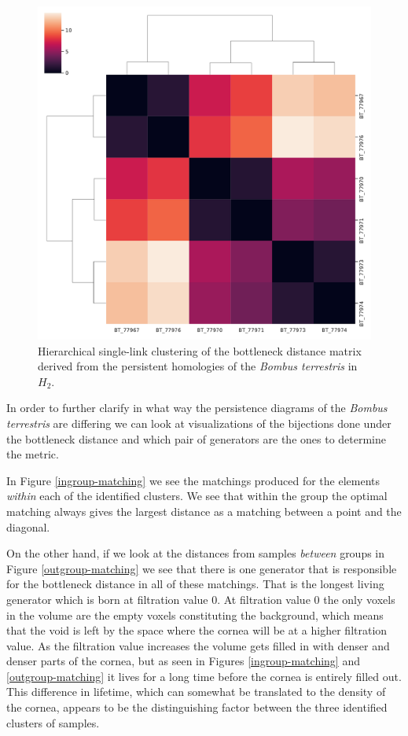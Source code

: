 \begin{figure}[ht]
  \centering
  \includegraphics[scale=0.35]{clusters/bottleneck_h2_cluster.pdf}
  \caption{\label{h2b} Hierarchical single-link clustering of the bottleneck distance matrix derived from the persistent homologies of the \textit{Bombus terrestris} in $H_{2}$.}
\end{figure}

In order to further clarify in what way the persistence diagrams of the \textit{Bombus terrestris} are differing we can look at visualizations of the bijections done under the bottleneck distance and which pair of generators are the ones to determine the metric.

In Figure \ref{ingroup-matching} we see the matchings produced for the elements \textit{within} each of the identified clusters. We see that within the group the optimal matching always gives the largest distance as a matching between a point and the diagonal.

On the other hand, if we look at the distances from samples \textit{between} groups in Figure \ref{outgroup-matching} we see that there is one generator that is responsible for the bottleneck distance in all of these matchings. That is the longest living generator which is born at filtration value $0$. At filtration value $0$ the only voxels in the volume are the empty voxels constituting the background, which means that the void is left by the space where the cornea will be at a higher filtration value. As the filtration value increases the volume gets filled in with denser and denser parts of the cornea, but as seen in Figures \ref{ingroup-matching} and \ref{outgroup-matching} it lives for a long time before the cornea is entirely filled out. This difference in lifetime, which can somewhat be translated to the density of the cornea, appears to be the distinguishing factor between the three identified clusters of samples.

